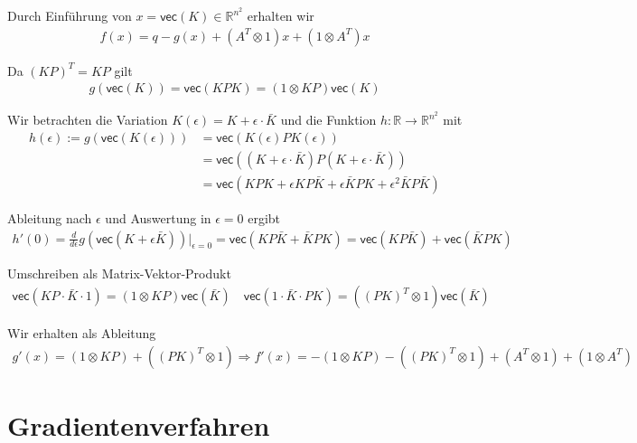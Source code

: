 \documentclass[a4paper, 12pt]{scrartcl}
\begin{document}
Durch Einführung von $x = \textsf{vec}(K) \in \mathbb{R}^{n^2}$ erhalten wir 
%
\begin{align*}
    f(x) = q - g(x)+ (A^T \otimes 1)x + (1 \otimes A^T)x
\end{align*}

Da $(KP)^T = KP$ gilt 
% 
\begin{align*}
    g(\textsf{vec}(K)) = \textsf{vec}(KPK) = (1 \otimes KP) \textsf{vec}(K) 
\end{align*}



Wir betrachten die Variation $K(\epsilon) = K + \epsilon \cdot \bar{K}$ und die Funktion $h:\mathbb{R} \to \mathbb{R}^{n^2}$ mit
%
\begin{align*}
    h(\epsilon) 
    := g(\textsf{vec}(K(\epsilon))) 
    &= \textsf{vec}(K(\epsilon) P K(\epsilon)) \\
    &= \textsf{vec}((K + \epsilon \cdot \bar{K}) P (K + \epsilon \cdot \bar{K})) \\
    &= \textsf{vec}(KPK + \epsilon KP \bar{K} + \epsilon \bar{K} PK + \epsilon^2 \bar{K} P \bar{K})
\end{align*}

Ableitung nach $\epsilon$ und Auswertung in $\epsilon = 0$ ergibt
%
\begin{align*}
    h'(0) 
    = \frac{d}{d\epsilon} g(\textsf{vec}(K + \epsilon \bar{K})) \bigg|_{\epsilon = 0} 
    = \textsf{vec}(KP\bar{K} + \bar{K}PK)
    = \textsf{vec}(KP\bar{K}) + \textsf{vec}(\bar{K}PK)
\end{align*}

Umschreiben als Matrix-Vektor-Produkt
%
\begin{align*}
    \textsf{vec}(KP \cdot \bar{K} \cdot 1) = (1 \otimes KP) \textsf{vec}(\bar{K}) \quad \textsf{vec}(1 \cdot \bar{K} \cdot PK) = ((PK)^T \otimes 1) \textsf{vec}(\bar{K})
\end{align*}

Wir erhalten als Ableitung 
%
\begin{align*}
    g'(x) = (1 \otimes KP) + ((PK)^T \otimes 1) \Rightarrow f'(x) = - (1 \otimes KP) - ((PK)^T \otimes 1) + (A^T \otimes 1) + (1 \otimes A^T)
\end{align*}

\newpage



\section{Gradientenverfahren}
\end{document}
